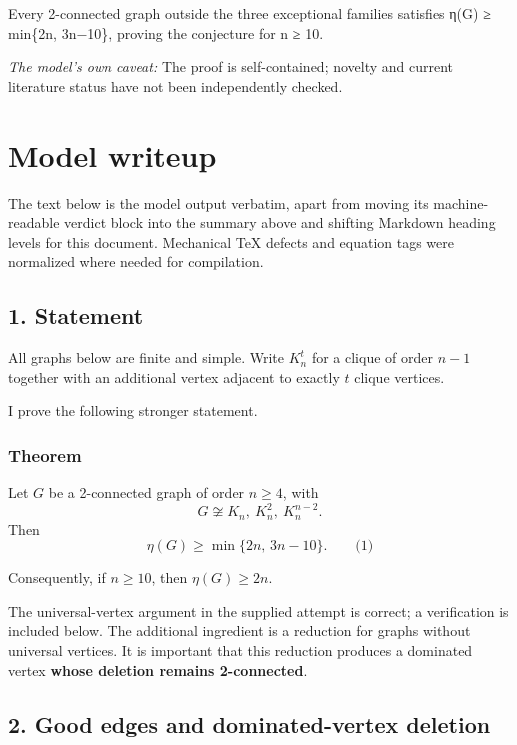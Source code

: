 \documentclass[
  11pt,
  a4paper,
]{article}
\begin{document}
Every 2-connected graph outside the three exceptional families satisfies
η(G) ≥ min\{2n, 3n−10\}, proving the conjecture for n ≥ 10.

\emph{The model's own caveat:} The proof is self-contained; novelty and
current literature status have not been independently checked.

\section{Model writeup}\label{model-writeup}

The text below is the model output verbatim, apart from moving its
machine-readable verdict block into the summary above and shifting
Markdown heading levels for this document. Mechanical TeX defects and
equation tags were normalized where needed for compilation.

\subsection{1. Statement}\label{statement}

All graphs below are finite and simple. Write \(K_n^t\) for a clique of
order \(n-1\) together with an additional vertex adjacent to exactly
\(t\) clique vertices.

I prove the following stronger statement.

\subsubsection{Theorem}\label{theorem}

Let \(G\) be a 2-connected graph of order \(n\ge4\), with \[
G\not\cong K_n,\ K_n^2,\ K_n^{n-2}.
\] Then \[
\boxed{\eta(G)\ge \min\{2n,\,3n-10\}.}
\qquad\text{(1)}
\]

Consequently, if \(n\ge10\), then \(\eta(G)\ge2n\).

The universal-vertex argument in the supplied attempt is correct; a
verification is included below. The additional ingredient is a reduction
for graphs without universal vertices. It is important that this
reduction produces a dominated vertex \textbf{whose deletion remains
2-connected}.

\subsection{2. Good edges and dominated-vertex
deletion}\label{good-edges-and-dominated-vertex-deletion}
\end{document}
